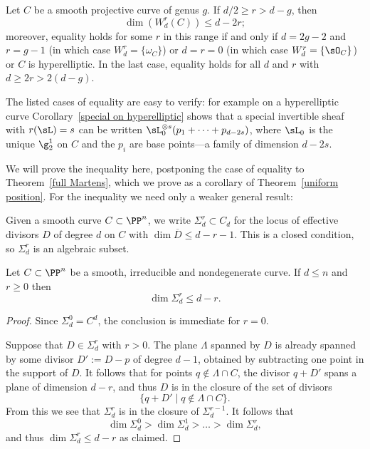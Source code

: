 \begin{theorem}\cite{Martens}\label{Martens' inequality}
Let $C$ be a smooth projective curve of genus $g$. If $d/2 \geq r > d-g$, then 
$$
\dim(W^r_d(C)) \leq d-2r;
$$
moreover, equality holds for some $r$ in this range if and only if $d=2g-2$ and $r= g-1$ (in which case $W^r_d = \{\omega_C\}$) or
$d=r=0$ (in which case $W^r_d = \{\sO_C\}$) or $C$ is hyperelliptic. In the last case, equality holds for all $d$ and $r$ with $d\geq 2r > 2(d-g)$.
\end{theorem}

The listed cases of equality are easy to verify: for example on a hyperelliptic curve Corollary~\ref{special on hyperelliptic} shows that a special invertible sheaf with  $r(\sL) = s$ can be written $\sL_0^{\otimes s}(p_1+\cdots + p_{d-2s})$, where
$\sL_0$ is the unique $\g^1_2$ on $C$ and the $p_i$ are base points---a family of dimension $d-2s$.

We will prove the inequality here, postponing the case of equality to Theorem~\ref{full Martens}, which we prove as a corollary of Theorem~\ref{uniform position}. For the inequality we need only a weaker general result:

Given 
a smooth curve $C \subset \PP^n$, we write $\Sigma^r_d \subset C_d$ for the locus of effective divisors $D$ of degree $d$ on $C$ with $\dim \overline D \leq d-r-1$. This is a closed condition, so
$\Sigma^r_d$ is an algebraic subset.

\begin{lemma}\label{elementary secant plane lemma}
Let $C \subset \PP^n$ be a smooth, irreducible and nondegenerate curve. If $d \leq n$ and $r \geq 0$ then
$$
\dim \Sigma^r_d \leq d-r.
$$
\end{lemma}

\begin{proof}
Since $\Sigma^0_d = C^d$, the conclusion is immediate for $r=0$.

Suppose that  $D\in \Sigma^r_d$ with $r>0$. The plane
$\Lambda$ spanned by $D$ is already spanned by some divisor  $D' := D -p$ of degree $d-1$, 
obtained by subtracting one point  in the support of $D$.
It follows that for points $q\notin \Lambda \cap C$, the divisor $q+D'$ spans a plane of dimension $d-r$, and thus $D$ is in the closure of the set of divisors
$$
\{q+D' \mid q\notin \Lambda \cap C \}.
$$
From this we see that $\Sigma^r_d$ is in the closure of  $\Sigma^{r-1}_d$. It follows that 
$$
\dim \Sigma^0_d >  \dim \Sigma^1_d > \dots > \dim \Sigma^r_d,
$$ 
and thus $\dim \Sigma^r_d \leq d-r$ as claimed.
\end{proof}


